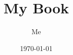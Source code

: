 \documentclass{book}
\begin{document}
\frontmatter
\title{My Book}
\author{Me}
\date{\today}
\maketitle

\tableofcontents

\mainmatter


% 

\backmatter
\end{document}
